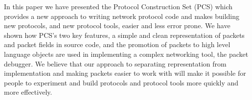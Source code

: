 \documentclass{sig-alternate-10pt}
\begin{document}
In this paper we have presented the Protocol Construction Set (PCS)
which provides a new approach to writing network protocol code and
makes building new protocols, and new protocol tools, easier and less
error prone.  We have shown how PCS's two key features, a simple and
clean representation of packets and packet fields in source code, and
the promotion of packets to high level language objects are used in
implementing a complex networking tool, the packet debugger.  We
believe that our approach to separating representation from
implementation and making packets easier to work with will make it
possible for people to experiment and build protocols and protocol
tools more quickly and more effectively.



\end{document}
